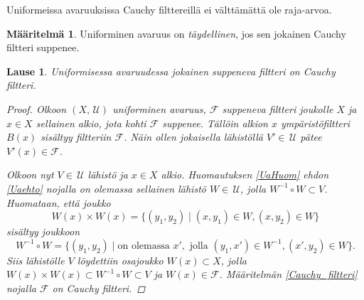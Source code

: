 \documentclass[12pt,a4paper,leqno]{report}
\newcommand{\U}{\,\mathcal{U}}
\newcommand{\F}{\mathcal{F}}
\theoremstyle{plain}
\newtheorem{lause}[equation]{Lause}
\theoremstyle{definition}
\newtheorem{maar}[equation]{Määritelmä}
\theoremstyle{remark}
\begin{document}
\noindent Uniformeissa avaruuksissa Cauchy filttereillä ei välttämättä ole raja-arvoa.

\begin{maar}
Uniforminen avaruus on \emph{täydellinen}, 
jos sen jokainen Cauchy filtteri suppenee.
\end{maar}
\begin{lause}
Uniformisessa avaruudessa jokainen suppeneva filtteri on Cauchy filtteri.
\begin{proof}
Olkoon $(X,\U)$ uniforminen avaruus, $\F$ suppeneva filtteri joukolle $X$ ja $x\in X$ 
sellainen alkio, jota kohti $\F$ suppenee. 
Tällöin alkion $x$ ympäristöfiltteri $B(x)$ sisältyy filtteriin $\F$. 
Näin ollen jokaisella lähistöllä $V'\in\U$ pätee $V'(x)\in\F$. 

Olkoon nyt $V\in\U$ lähistö ja $x\in X$ alkio. Huomautuksen \ref{UaHuom} ehdon \ref{Uaehto} nojalla on olemassa 
sellainen lähistö $W\in\U$, jolla $W^{-1}\circ W\subset V$. 
Huomataan, että joukko 
$$W(x)\times W(x)=\{ (y_1,y_2)\mid (x,y_1)\in W,(x,y_2)\in W\} $$
sisältyy joukkoon 
$$W^{-1}\circ W=\{ (y_1,y_2)\mid \text{on olemassa }x',\text{ jolla }(y_1,x')\in W^{-1},(x',y_2)\in W\}.$$ 
Siis lähistölle $V$ löydettiin osajoukko $W(x)\subset X$, 
jolla $W(x)\times W(x)\subset W^{-1}\circ W\subset V$ ja $W(x)\in\F$. 
Määritelmän \ref{Cauchy_filtteri} nojalla $\F$ on Cauchy filtteri.
\end{proof}
\end{lause}
\end{document}
